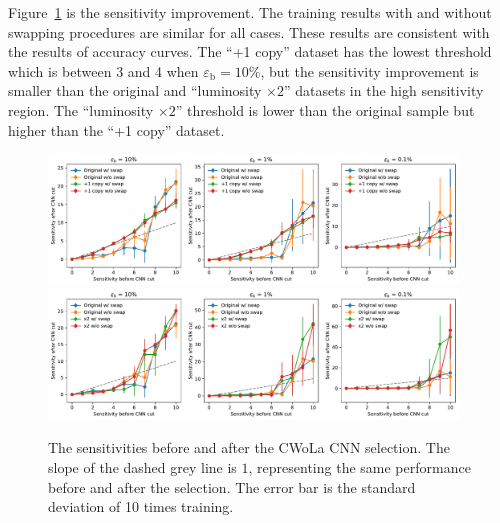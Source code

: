 \documentclass[12pt]{article}
\begin{document}
        Figure~\ref{fig:sensitivity_improvement_bkg_eff_no_swap} is the sensitivity improvement. The training results with and without swapping procedures are similar for all cases. These results are consistent with the results of accuracy curves. The ``+1 copy'' dataset has the lowest threshold which is between 3 and 4 when $\varepsilon_{\text{b}} = 10\%$, but the sensitivity improvement is smaller than the original and ``luminosity $\times 2$'' datasets in the high sensitivity region. The ``luminosity $\times 2$'' threshold is lower than the original sample but higher than the ``+1 copy'' dataset.
        \begin{figure}[htpb]
            \centering
            \includegraphics[width=0.97\textwidth]{HVmodel_sensitivity_improvement_bkg_eff_copy_1_no_swap.pdf}
            \includegraphics[width=0.97\textwidth]{HVmodel_sensitivity_improvement_bkg_eff_x2_no_swap.pdf}
            \caption{The sensitivities before and after the CWoLa CNN selection. The slope of the dashed grey line is $1$, representing the same performance before and after the selection. The error bar is the standard deviation of 10 times training.}
            \label{fig:sensitivity_improvement_bkg_eff_no_swap}
        \end{figure}
\end{document}
